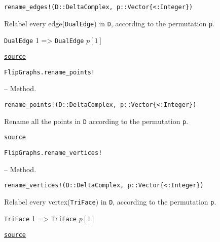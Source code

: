 \begin{adjustwidth}{2em}{0pt}


\begin{verbatim}
rename_edges!(D::DeltaComplex, p::Vector{<:Integer})
\end{verbatim}

Relabel every edge(\texttt{DualEdge}) in \texttt{D}, according to the permutation \texttt{p}.

\texttt{DualEdge} 1 => \texttt{DualEdge} \(p[1]\)



\href{https://github.com/schto223/FlipGraphs.jl/blob/e35d43698a06b86273148826b79d585ba04fcd26/src/deltaComplex.jl#L1128-L1134}{\texttt{source}}


\end{adjustwidth}
\hypertarget{14975581289018999996}{\texttt{FlipGraphs.rename\_points!}}  -- {Method.}

\begin{adjustwidth}{2em}{0pt}


\begin{verbatim}
rename_points!(D::DeltaComplex, p::Vector{<:Integer})
\end{verbatim}

Rename all the points in \texttt{D} according to the permutation \texttt{p}.



\href{https://github.com/schto223/FlipGraphs.jl/blob/e35d43698a06b86273148826b79d585ba04fcd26/src/deltaComplex.jl#L1103-L1107}{\texttt{source}}


\end{adjustwidth}
\hypertarget{14047662745601523605}{\texttt{FlipGraphs.rename\_vertices!}}  -- {Method.}

\begin{adjustwidth}{2em}{0pt}


\begin{verbatim}
rename_vertices!(D::DeltaComplex, p::Vector{<:Integer})
\end{verbatim}

Relabel every vertex(\texttt{TriFace}) in \texttt{D}, according to the permutation \texttt{p}.

\texttt{TriFace} 1 => \texttt{TriFace} \(p[1]\) 



\href{https://github.com/schto223/FlipGraphs.jl/blob/e35d43698a06b86273148826b79d585ba04fcd26/src/deltaComplex.jl#L1114-L1120}{\texttt{source}}


\end{adjustwidth}


